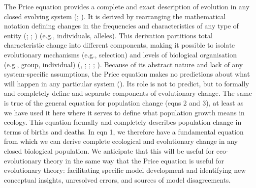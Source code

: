\documentclass[
]{article}
\begin{document}
The Price equation provides a complete and exact description of
evolution in any closed evolving system (; ). It is derived by
rearranging the mathematical notation defining changes in the
frequencies and characteristics of any type of entity
(;
; ) (e.g., individuals, alleles). This derivation partitions total
characteristic change into different components, making it possible to
isolate evolutionary mechanisms (e.g., selection) and levels of
biological organisation (e.g., group, individual)
(, ;
;
; ). Because of its abstract nature and lack of any
system-specific assumptions, the Price equation makes no predictions
about what will happen in any particular system
(). Its role is not to predict,
but to formally and completely define and separate components of
evolutionary change. The same is true of the general equation for
population change (eqns 2 and 3), at least as we have used it here where
it serves to define what population growth means in ecology. This
equation formally and completely describes population change in terms of
births and deaths. In eqn 1, we therefore have a fundamental equation
from which we can derive complete ecological and evolutionary change in
any closed biological population. We anticipate that this will be useful
for eco-evolutionary theory in the same way that the Price equation is
useful for evolutionary theory: facilitating specific model development
and identifying new conceptual insights, unresolved errors, and sources
of model disagreements.
\end{document}
